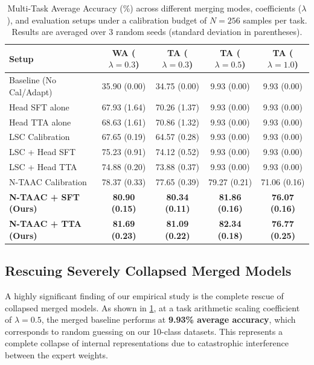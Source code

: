\documentclass{article}
\theoremstyle{plain}
\theoremstyle{definition}
\theoremstyle{remark}
\begin{document}
\begin{table}[t]
\caption{Multi-Task Average Accuracy (\%) across different merging modes, coefficients ($\lambda$), and evaluation setups under a calibration budget of $N=256$ samples per task. Results are averaged over 3 random seeds (standard deviation in parentheses).}
\label{tab:main_results}
\vskip 0.15in
\begin{center}
\begin{small}
\begin{sc}
\begin{tabular}{lcccc}
\toprule
Setup & WA ($\lambda=0.3$) & TA ($\lambda=0.3$) & TA ($\lambda=0.5$) & TA ($\lambda=1.0$) \\
\midrule
Baseline (No Cal/Adapt) & 35.90 (0.00) & 34.75 (0.00) & 9.93 (0.00) & 9.93 (0.00) \\
Head SFT alone          & 67.93 (1.64) & 70.26 (1.37) & 9.93 (0.00) & 9.93 (0.00) \\
Head TTA alone          & 68.63 (1.61) & 70.86 (1.32) & 9.93 (0.00) & 9.93 (0.00) \\
LSC Calibration         & 67.65 (0.19) & 64.57 (0.28) & 9.93 (0.00) & 9.93 (0.00) \\
LSC + Head SFT          & 75.23 (0.91) & 74.12 (0.52) & 9.93 (0.00) & 9.93 (0.00) \\
LSC + Head TTA          & 74.88 (0.20) & 73.88 (0.37) & 9.93 (0.00) & 9.93 (0.00) \\
N-TAAC Calibration      & 78.37 (0.33) & 77.65 (0.39) & 79.27 (0.21) & 71.06 (0.16) \\
\textbf{N-TAAC + SFT (Ours)} & \textbf{80.90 (0.15)} & \textbf{80.34 (0.11)} & \textbf{81.86 (0.16)} & \textbf{76.07 (0.16)} \\
\textbf{N-TAAC + TTA (Ours)} & \textbf{81.69 (0.23)} & \textbf{81.09 (0.22)} & \textbf{82.34 (0.18)} & \textbf{76.77 (0.25)} \\
\bottomrule
\end{tabular}
\end{sc}
\end{small}
\end{center}
\vskip -0.1in
\end{table}

\subsection{Rescuing Severely Collapsed Merged Models}
A highly significant finding of our empirical study is the complete rescue of collapsed merged models. As shown in \cref{tab:main_results}, at a task arithmetic scaling coefficient of $\lambda = 0.5$, the merged baseline performs at \textbf{9.93\% average accuracy}, which corresponds to random guessing on our 10-class datasets. This represents a complete collapse of internal representations due to catastrophic interference between the expert weights.
\end{document}
